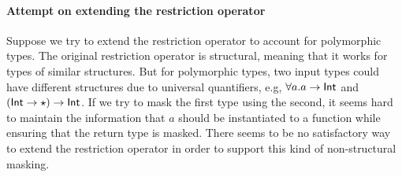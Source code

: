 \paragraph{Attempt on extending the restriction operator}
Suppose we try to extend the restriction operator to account for polymorphic
types. The original restriction operator is structural, meaning that it works
for types of similar structures. But for polymorphic types, two input types
could have different structures due to universal quantifiers, e.g, $\forall a. a
\to \mathsf{Int}$ and $(\mathsf{Int} \to \star) \to \mathsf{Int}$. If we try to mask the first type
using the second, it seems hard to maintain the information that $a$ should be
instantiated to a function while ensuring that the return type is masked. There
seems to be no satisfactory way to extend the restriction operator in order to
support this kind of non-structural masking.

